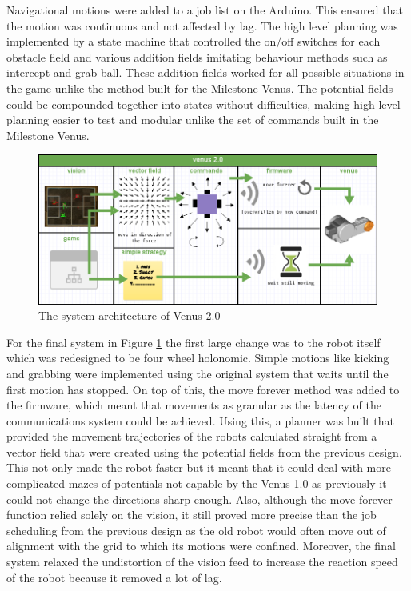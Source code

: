 \documentclass[a4paper,12pt]{article}
\begin{document}
Navigational motions were added to a job list on the Arduino. This ensured that the motion was continuous and not affected by lag. The high level planning was implemented by a state machine that controlled the on/off switches for each obstacle field and various addition fields imitating behaviour methods such as intercept and grab ball. These addition fields worked for all possible situations in the game unlike the method built for the Milestone Venus. The potential fields could be compounded together into states without difficulties, making high level planning easier to test and modular unlike the set of commands built in the Milestone Venus.
\begin{figure}
  \vspace{-15pt}
  \includegraphics[scale=0.35]{arch3.png}
  \vspace{-24pt}
  \caption{The system architecture of Venus 2.0}
  \label{fig:venus2}
  \vspace{-18pt}
\end{figure}
  
For the final system in Figure \ref{fig:venus2} the first large change was to the robot itself which was redesigned to be four wheel holonomic. Simple motions like kicking and grabbing were implemented using the original system that waits until the first motion has stopped. On top of this, the move forever method was added to the firmware, which meant that movements as granular as the latency of the communications system could be achieved. Using this, a planner was built that provided the movement trajectories of the robots calculated straight from a vector field that were created using the potential fields from the previous design. This not only made the robot faster but it meant that it could deal with more complicated mazes of potentials not capable by the Venus 1.0 as previously it could not change the directions sharp enough. Also, although the move forever function relied solely on the vision, it still proved more precise than the job scheduling from the previous design as the old robot would often move out of alignment with the grid to which its motions were confined. Moreover, the final system relaxed the undistortion of the vision feed to increase the reaction speed of the robot because it removed a lot of lag.
\end{document}
